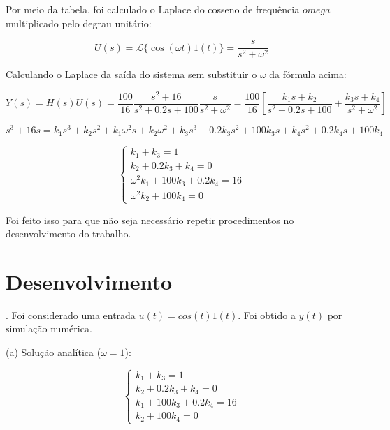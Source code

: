 \documentclass[10pt]{article}
\begin{document}
\quad Por meio da tabela, foi calculado o Laplace do cosseno de frequência $omega$ multiplicado pelo degrau unitário:

\begin{equation}
    U(s) = \mathcal{L}\{ \cos(\omega t) 1(t) \} = \frac{s}{s^2 + \omega^2}
\end{equation}

\quad Calculando o Laplace da saída do sistema sem substituir o $\omega$ da fórmula acima:

\begin{equation}
    Y(s) = H(s)U(s) = \frac{100}{16} \frac{s^2 + 16}{s^2 + 0.2s + 100} \frac{s}{s^2 + \omega^2} = \frac{100}{16} \left[ \frac{k_1s + k_2}{s^2 + 0.2s + 100} + \frac{k_3s + k_4}{s^2 + \omega^2} \right] 
\end{equation}

\begin{equation}
    s^3 + 16s = k_1s^3 + k_2s^2 + k_1\omega^2 s + k_2\omega^2 + k_3s^3 + 0.2k_3s^2 + 100k_3s + k_4s^2 + 0.2k_4s + 100k_4
\end{equation}

\begin{equation}
    \left\{
    \begin{array}{l}
        k_1 + k_3 = 1 \\
        k_2 + 0.2k_3 +k_4 = 0 \\
        \omega^2k_1 + 100k_3 + 0.2k_4 = 16 \\
        \omega^2k_2 + 100k_4 = 0
    \end{array}
    \right. 
\end{equation}

\quad Foi feito isso para que não seja necessário repetir procedimentos no desenvolvimento do trabalho.

\newpage

\section{Desenvolvimento}

. Foi considerado uma entrada $u(t) = cos(t) 1(t)$. Foi obtido a $y(t)$ por simulação numérica.

\quad (a) Solução analítica ($\omega = 1$):

\begin{equation}
    \left\{
    \begin{array}{l}
        k_1 + k_3 = 1 \\
        k_2 + 0.2k_3 +k_4 = 0 \\
        k_1 + 100k_3 + 0.2k_4 = 16 \\
        k_2 + 100k_4 = 0
    \end{array}
    \right. 
\end{equation}
\end{document}
